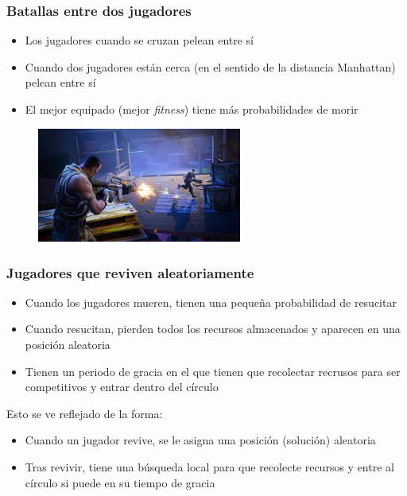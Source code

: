 \documentclass{beamer}
\begin{document}
\begin{frame}
    \frametitle{Batallas entre dos jugadores}

    \begin{itemize}
        \item Los jugadores cuando se cruzan pelean entre sí
        \item Cuando dos jugadores están cerca (en el sentido de la distancia Manhattan) pelean entre sí
        \item El mejor equipado (mejor \emph{fitness}) tiene más probabilidades de morir
    \end{itemize}

    \begin{figure}
        \centering
        \includegraphics[width=0.6\textwidth]{fight}
    \end{figure}

\end{frame}

\begin{frame}
    \frametitle{Jugadores que reviven aleatoriamente}

    \begin{itemize}
        \item Cuando los jugadores mueren, tienen una pequeña probabilidad de resucitar \footnotemark
        \item Cuando resucitan, pierden todos los recursos almacenados y aparecen en una posición aleatoria
        \item Tienen un periodo de gracia en el que tienen que recolectar recrusos para ser competitivos y entrar dentro del círculo
    \end{itemize}

    Esto se ve reflejado de la forma:

    \begin{itemize}
        \item Cuando un jugador revive, se le asigna una posición (solución) aleatoria
        \item Tras revivir, tiene una búsqueda local para que recolecte recursos y entre al círculo si puede en su tiempo de gracia
    \end{itemize}

\end{frame}
\end{document}
